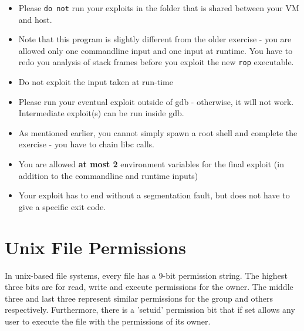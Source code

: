 \documentclass[a4paper,11pt]{article}
\begin{document}
\begin{itemize}
\item Please \texttt{do not} run your exploits in the folder that is shared
  between your VM and host.
\item Note that this program is slightly different from the older exercise - you
  are allowed only one commandline input and one input at runtime. You have to
  redo you analysis of stack frames before you exploit the new \texttt{rop}
  executable.
\item Do not exploit the input taken at run-time
\item Please run your eventual exploit outside of gdb - otherwise, it will not
  work. Intermediate exploit(s) can be run inside gdb.
\item As mentioned earlier, you cannot simply spawn a root shell and complete
  the exercise - you have to chain libc calls.
\item You are allowed \textbf{at most 2} environment variables for the final
  exploit (in addition to the commandline and runtime inputs)
\item Your exploit has to end without a segmentation fault, but does not have to
give a specific exit code.
\end{itemize}

\section*{Unix File Permissions}
In unix-based file systems, every file has a 9-bit permission string. The highest
three bits are for read, write and execute permissions for the owner.  The middle
three and last three represent similar permissions for the group and others
respectively. Furthermore, there is a 'setuid' permission bit that if set allows
any user to execute the file with the permissions of its owner.
\end{document}
